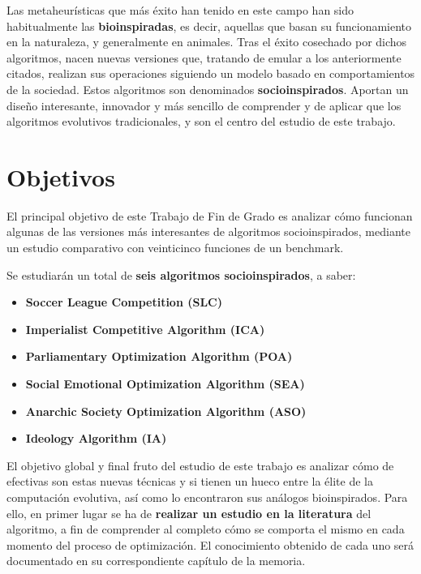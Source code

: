 Las metaheurísticas que más éxito han tenido en este campo han sido habitualmente las \textbf{bioinspiradas}, es decir, aquellas que basan su funcionamiento en la naturaleza, y generalmente en animales. Tras el éxito cosechado por dichos algoritmos, nacen nuevas versiones que, tratando de emular a los anteriormente citados, realizan sus operaciones siguiendo un modelo basado en comportamientos de la sociedad. Estos algoritmos son denominados \textbf{socioinspirados}. Aportan un diseño interesante, innovador y más sencillo de comprender y de aplicar que los algoritmos evolutivos tradicionales, y son el centro del estudio de este trabajo.

\section{Objetivos}

El principal objetivo de este Trabajo de Fin de Grado es analizar cómo funcionan algunas de las versiones más interesantes de algoritmos socioinspirados, mediante un estudio comparativo con veinticinco funciones de un benchmark. 

Se estudiarán un total de \textbf{seis algoritmos socioinspirados}, a saber:

\begin{itemize}
	\item \textbf{Soccer League Competition (SLC)} \cite{slc-nonlinear-eq} \cite{slc-article}
	\item \textbf{Imperialist Competitive Algorithm (ICA)} \cite{ica-conference}
	\item \textbf{Parliamentary Optimization Algorithm (POA)} \cite{poa-article}
	\item \textbf{Social Emotional Optimization Algorithm (SEA)} \cite{sea-chapter}
	\item \textbf{Anarchic Society Optimization Algorithm (ASO)} \cite{aso-conference} \cite{aso-chapter}
	\item \textbf{Ideology Algorithm (IA)} \cite{ia-article}
\end{itemize}

El objetivo global y final fruto del estudio de este trabajo es analizar cómo de efectivas son estas nuevas técnicas y si tienen un hueco entre la élite de la computación evolutiva, así como lo encontraron sus análogos bioinspirados. Para ello, en primer lugar se ha de \textbf{realizar un estudio en la literatura} del algoritmo, a fin de comprender al completo cómo se comporta el mismo en cada momento del proceso de optimización. El conocimiento obtenido de cada uno será documentado en su correspondiente capítulo de la memoria.

